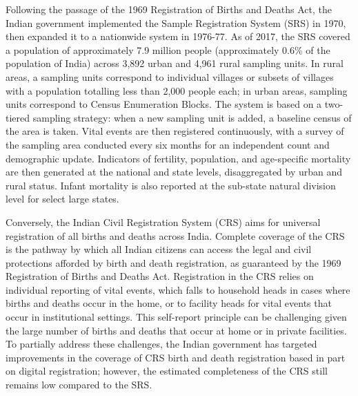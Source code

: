 \documentclass[
]{report}
\begin{document}
Following the passage of the 1969 Registration of Births and Deaths Act, the Indian government implemented the Sample Registration System (SRS) in 1970, then expanded it to a nationwide system in 1976-77.\autocite{Bhat2002} As of 2017, the SRS covered a population of approximately 7.9 million people (approximately 0.6\% of the population of India) across 3,892 urban and 4,961 rural sampling units.\autocite{CensusofIndia2017} In rural areas, a sampling units correspond to individual villages or subsets of villages with a population totalling less than 2,000 people each; in urban areas, sampling units correspond to Census Enumeration Blocks.\autocite{CensusofIndia2017} The system is based on a two-tiered sampling strategy: when a new sampling unit is added, a baseline census of the area is taken. Vital events are then registered continuously, with a survey of the sampling area conducted every six months for an independent count and demographic update.\autocite{Mahapatra2010} Indicators of fertility, population, and age-specific mortality are then generated at the national and state levels, disaggregated by urban and rural status. Infant mortality is also reported at the sub-state natural division level for select large states.\autocite{CensusofIndia2017}

Conversely, the Indian Civil Registration System (CRS) aims for universal registration of all births and deaths across India. Complete coverage of the CRS is the pathway by which all Indian citizens can access the legal and civil protections afforded by birth and death registration, as guaranteed by the 1969 Registration of Births and Deaths Act.\autocite{Abouzahr2007,ParliamentoftheRepublicofIndia1969} Registration in the CRS relies on individual reporting of vital events, which falls to household heads in cases where births and deaths occur in the home, or to facility heads for vital events that occur in institutional settings. This self-report principle can be challenging given the large number of births and deaths that occur at home or in private facilities.\autocite{Mohanty2018} To partially address these challenges, the Indian government has targeted improvements in the coverage of CRS birth and death registration based in part on digital registration; however, the estimated completeness of the CRS still remains low compared to the SRS.\autocite{Kumar2019}
\end{document}
